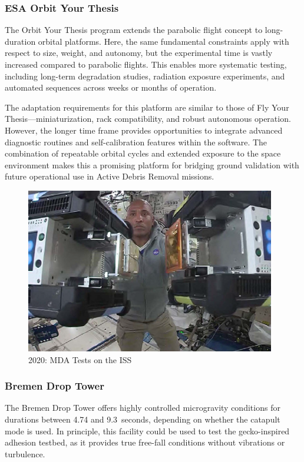 \documentclass[
    twocolumn,
    fontsize = 10pt,
    parskip = half+,
    headings = small,
    headwidth = text,
    footwidth = text,
]{scrartcl}
\begin{document}
\subsubsection{ESA Orbit Your Thesis}
The Orbit Your Thesis program extends the parabolic flight concept to long-duration orbital platforms. 
Here, the same fundamental constraints apply with respect to size, weight, and autonomy, 
but the experimental time is vastly increased compared to parabolic flights. 
This enables more systematic testing, including long-term degradation studies, 
radiation exposure experiments, and automated sequences across weeks or months of operation.  

The adaptation requirements for this platform are similar to those of Fly Your Thesis—miniaturization, 
rack compatibility, and robust autonomous operation. 
However, the longer time frame provides opportunities to integrate 
advanced diagnostic routines and self-calibration features within the software. 
The combination of repeatable orbital cycles and extended exposure to the space environment 
makes this a promising platform for bridging ground validation with future operational use in Active Debris Removal missions.

\begin{figure}[h!]
    \centering
    \includegraphics[width=0.7\linewidth]{pics/orbit.png}
    \caption{2020: MDA Tests on the ISS}
    \label{fig:orbit}
\end{figure}

\subsubsection{Bremen Drop Tower}
The Bremen Drop Tower offers highly controlled microgravity conditions for durations between 4.74 and 9.3~seconds, 
depending on whether the catapult mode is used. 
In principle, this facility could be used to test the gecko-inspired adhesion testbed, 
as it provides true free-fall conditions without vibrations or turbulence.  
\end{document}
